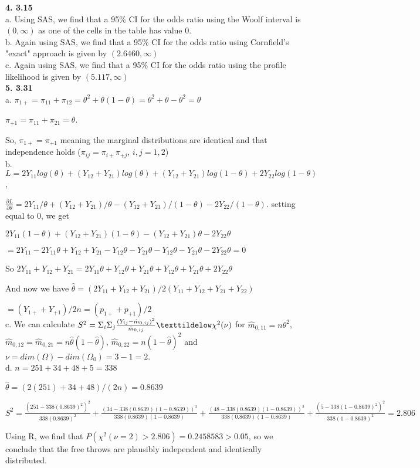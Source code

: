 \documentclass{article}
\begin{document}
\textbf{4. 3.15}\\

a. Using SAS, we find that a 95\% CI for the odds ratio using the Woolf interval is $(0, \infty)$ as one of the cells in the table has value 0.
\\

b. Again using SAS, we find that a 95\% CI for the odds ratio using Cornfield's "exact" approach is given by $(2.6460, \infty)$
\\

c. Again using SAS, we find that a 95\% CI for the odds ratio using the profile likelihood is given by $(5.117, \infty)$
\\

\textbf{5. 3.31}\\

a. $\pi_{1+} = \pi_{11} + \pi_{12} = \theta^2 + \theta(1-\theta) = \theta^2 + \theta - \theta^2 = \theta$

$\pi_{+1} = \pi_{11} + \pi_{21} = \theta$.

So, $\pi_{1+} = \pi_{+1}$ meaning the marginal distributions are identical and that independence holds ($\pi_{ij} = \pi_{i+}\pi_{+j}$, $i,j=1,2$)
\\

b. $L = 2Y_{11} log(\theta) + (Y_{12} + Y_{21}) log(\theta) + (Y_{12} + Y_{21}) log(1 - \theta) + 2Y_{22} log(1 - \theta)$, 

$\frac{\partial{L}}{\partial{\theta}} = 2Y_{11}/\theta + (Y_{12} + Y_{21})/\theta - (Y_{12} + Y_{21})/(1 - \theta) - 2Y_{22}/(1 - \theta)$. setting equal to 0, we get

$2Y_{11}(1-\theta) + (Y_{12} + Y_{21})(1-\theta) - (Y_{12} + Y_{21})\theta - 2Y_{22}\theta$

$= 2Y_{11}-2Y_{11}\theta + Y_{12} + Y_{21}-Y_{12}\theta - Y_{21}\theta - Y_{12}\theta - Y_{21}\theta - 2Y_{22}\theta  =0$

So $2Y_{11} + Y_{12} + Y_{21} = 2Y_{11}\theta + Y_{12}\theta + Y_{21}\theta + Y_{12}\theta + Y_{21}\theta + 2Y_{22}\theta$

And now we have $\hat\theta = (2Y_{11} + Y_{12} + Y_{21})/2(Y_{11} + Y_{12} + Y_{21} + Y_{22})$

$= (Y_{1+} + Y_{+1})/2n = (p_{1+} + p_{+1})/2$
\\

c. We can calculate $S^2 = \Sigma_i \Sigma_j \frac{(Y_{ij}-\hat m_{0,ij})^2}{\hat m_{0,ij}} \texttildelow \chi^2(\nu)$ for $\hat m_{0,11} = n\theta^2$, $\hat m_{0,12} = \hat m_{0,21} = n\hat\theta(1-\hat\theta)$, $\hat m_{0,22} = n(1-\hat\theta)^2$ and $\nu = dim(\Omega) - dim(\Omega_0) = 3-1 = 2$.
\\

d. $n = 251 + 34 + 48 + 5 = 338$

$\hat\theta = (2(251) + 34 + 48)/(2n) = 0.8639$

$S^2 = \frac{(251-338(0.8639)^2)^2}{338(0.8639)^2} + \frac{(34 - 338(0.8639)(1-0.8639))^2}{338(0.8639)(1-0.8639)} + \frac{(48 - 338(0.8639)(1-0.8639))^2}{338(0.8639)(1-0.8639)} + \frac{(5-338(1-0.8639)^2)^2}{338(1-0.8639)^2} = 2.806$

Using R, we find that $P(\chi^2(\nu = 2) > 2.806) = 0.2458583 > 0.05$, so we conclude that the free throws are plausibly independent and identically distributed.
\end{document}
